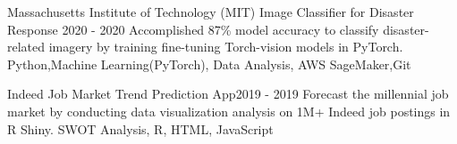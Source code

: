 \begin{projects}
	\project
	{Massachusetts Institute of Technology (MIT) Image Classifier for Disaster Response }{2020 - 2020}
	{  }
	{Accomplished 87\% model accuracy to classify disaster-related imagery by training fine-tuning Torch-vision models in PyTorch.}
	{Python,Machine Learning(PyTorch), Data Analysis, AWS SageMaker,Git}
				
	\project
	{Indeed Job Market Trend Prediction App}{2019 - 2019}
    {{Forecast the millennial job market by conducting data visualization analysis on 1M+ Indeed job postings in R Shiny.}}
    {}
	{SWOT Analysis, R, HTML, JavaScript}

\end{projects}